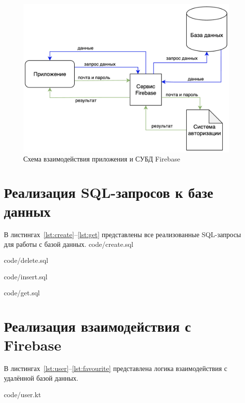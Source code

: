 \begin{figure}[H]
	\centering
	\includegraphics[height=0.25\textheight]{tools/img/interaction.png}
	\caption{
        Схема взаимодействия приложения и СУБД Firebase
    }
	\label{fig:interaction}
\end{figure}

\section{Реализация SQL-запросов к базе данных}
В листингах~\ref{lst:create}--\ref{lst:get} представлены все реализованные SQL-запросы для работы с базой данных.
 {code/create.sql}

 {code/delete.sql}

 {code/insert.sql}

 {code/get.sql}

\section{Реализация взаимодействия с Firebase}
В листингах~\ref{lst:user}--\ref{lst:favourite} представлена логика взаимодействия с удалённой базой данных.

 {code/user.kt}

